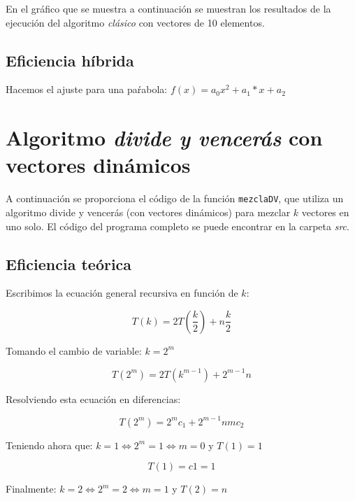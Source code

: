 \documentclass[11pt]{article}
\begin{document}
 En el gráfico que se muestra a continuación se muestran los resultados de la
 ejecución del algoritmo \textit{clásico} con vectores de 10 elementos.
 
 \begin{center}
 	
 \end{center}
 
 \subsection*{Eficiencia híbrida}
 
 Hacemos el ajuste para una paŕabola: $f(x) = a_{0}x^{2}+a_{1}*x + a_{2}$
 \begin{center}
 	
 \end{center}

\section*{Algoritmo \textit{divide y vencerás} con vectores dinámicos}

A continuación se proporciona el código de la función \texttt{mezclaDV},
que utiliza un algoritmo divide y vencerás (con vectores dinámicos) para mezclar $k$ vectores en uno solo. El
código del programa completo se puede encontrar en la carpeta \textit{src}.\\



\subsection*{Eficiencia teórica}

Escribimos la ecuación general recursiva en función de $k$:

$$ T(k) = 2T(\frac{k}{2}) + n\frac{k}{2} $$

Tomando el cambio de variable: $ k = 2^m $

$$ T(2^m) = 2T(k^{m-1}) + 2^{m-1}n $$

Resolviendo esta ecuación en diferencias:

$$ T(2^m) = 2^mc_1 + 2^{m-1}nm c_2 $$

Teniendo ahora que: $k = 1 \iff 2^m = 1 \iff m = 0$ y $T(1) = 1$

$$ T(1) = c1 = 1 $$

Finalmente: $k = 2 \iff 2^m = 2 \iff m = 1$ y $T(2) = n$
\end{document}
